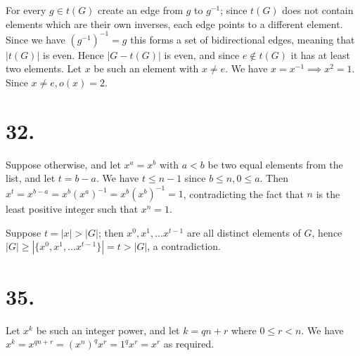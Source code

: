 \documentclass{article}
\begin{document}
For every $g \in t(G)$ create an edge from $g$ to $g^{-1}$; since $t(G)$ does not contain elements which are their own inverses, each edge points to a different element. Since we have $(g^{-1})^{-1} = g$ this forms a set of bidirectional edges, meaning that $|t(G)|$ is even. Hence $|G - t(G)|$ is even, and since $e \not\in t(G)$ it has at least two elements. Let $x$ be such an element with $x \ne e$. We have $x = x^{-1} \implies x^2 = 1$. Since $x \ne e, o(x) = 2$.

\section*{32.}

Suppose otherwise, and let $x^a = x^b$ with $a < b$ be two equal elements from the list, and let $t = b-a$. We have $t \le n-1$ since $b \le n, 0 \le a$. Then $x^t = x^{b-a} = x^b (x^a)^{-1} = x^b (x^b)^{-1} = 1$, contradicting the fact that $n$ is the least positive integer such that $x^n = 1$.

Suppose $t = |x| > |G|$; then $x^0, x^1, \ldots x^{t-1}$ are all distinct elements of $G$, hence $|G| \ge |\{x^0, x^1, \ldots x^{t-1}\}| = t > |G|$, a contradiction.

\section*{35.}

Let $x^k$ be such an integer power, and let $k = qn + r$ where $0 \le r < n$. We have $x^k = x^{qn+r} = (x^n)^q x^r = 1^q x^r = x^r$ as required.
\end{document}
